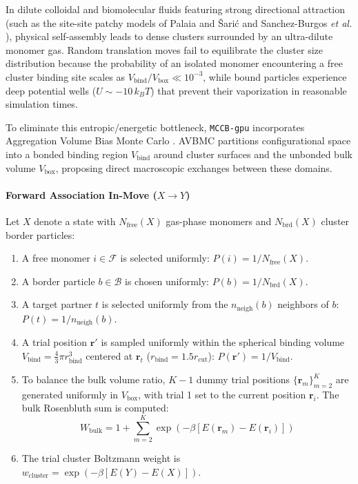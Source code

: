 \documentclass[final,5p,times,twocolumn]{elsarticle}
\begin{document}
In dilute colloidal and biomolecular fluids featuring strong directional attraction
(such as the site-site patchy models of Palaia and \v{S}ari\'{c}
\cite{palaia2022patchy} and Sanchez-Burgos \textit{et al.}
\cite{sanchezburgos2021size}), physical self-assembly leads to dense
clusters surrounded by an ultra-dilute monomer gas. Random translation
moves fail to equilibrate the cluster size distribution because the
probability of an isolated monomer encountering a free cluster binding
site 
scales as $V_{\text{bind}} / V_{\text{box}} \ll 10^{-3}$, while bound
particles experience deep potential wells ($U \sim -10\,k_B T$) that
prevent their vaporization in reasonable simulation times. 

To eliminate this entropic/energetic bottleneck, \texttt{MCCB-gpu}
incorporates Aggregation Volume Bias Monte Carlo
\cite{chen2000avbmc,chen2001avbmc}. AVBMC partitions configurational
space into a bonded binding region $V_{\text{bind}}$ around cluster
surfaces and the unbonded bulk volume $V_{\text{box}}$, proposing
direct macroscopic exchanges between these domains. 

\paragraph{Forward Association In-Move ($X \to Y$)}
Let $X$ denote a state with $N_{\text{free}}(X)$ gas-phase monomers and $N_{\text{brd}}(X)$ cluster border particles:
\begin{enumerate}
    \item A free monomer $i \in \mathcal{F}$ is selected uniformly:
      $P(i) = 1 / N_{\text{free}}(X)$. 
    \item A border particle $b \in \mathcal{B}$ is chosen uniformly:
      $P(b) = 1 / N_{\text{brd}}(X)$. 
    \item A target partner $t$ is selected uniformly from the
      $n_{\text{neigh}}(b)$ neighbors of $b$: $P(t) = 1 /
      n_{\text{neigh}}(b)$. 
    \item A trial position $\mathbf{r}'$ is sampled uniformly within
      the spherical binding volume $V_{\text{bind}} = \frac{4}{3}\pi
      r_{\text{bind}}^3$ centered at $\mathbf{r}_t$ ($r_{\text{bind}}
      = 1.5 r_{\text{cut}}$): $P(\mathbf{r}') = 1 / V_{\text{bind}}$. 
    \item To balance the bulk volume ratio, $K-1$ dummy trial
      positions $\{\mathbf{r}_m\}_{m=2}^K$ are generated uniformly in
      $V_{\text{box}}$, with trial 1 set to the current position
      $\mathbf{r}_i$. The bulk Rosenbluth sum is computed: 
    \begin{equation}
        W_{\text{bulk}} = 1 + \sum_{m=2}^K \exp\left(-\beta
        [E(\mathbf{r}_m) - E(\mathbf{r}_i)]\right) 
    \end{equation}
    \item The trial cluster Boltzmann weight is $w_{\text{cluster}} =
      \exp\left(-\beta [E(Y) - E(X)]\right)$. 
\end{enumerate}
\end{document}
